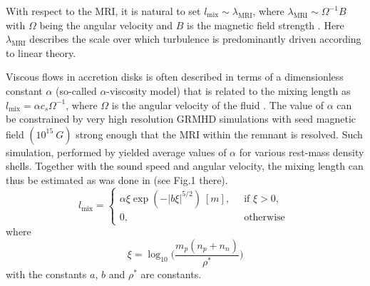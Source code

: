 
With respect to the \ac{MRI}, it is natural to set $l_{\text{mix}} \sim \lambda_{\text{MRI}}$, where
$\lambda_{\text{MRI}} \sim \Omega^{-1}B$ with $\Omega$ being the angular velocity and $B$ is the magnetic
field strength \citep{Duez:2006qe}.
Here $\lambda_{\text{MRI}}$ describes the scale over which turbulence is 
predominantly driven according to linear theory.


Viscous flows in accretion disks is often described in terms of a dimensionless constant $\alpha$
(so-called $\alpha$-viscosity model) that is related to the mixing length as 
%
$ l_{\text{mix}} = \alpha c_s \Omega^{-1} $, 
%
where $\Omega$ is the angular velocity of the fluid \citep{Shakura:1972te}.
%
The value of $\alpha$ can be constrained by very high resolution \ac{GRMHD} simulations with seed magnetic
field $(10^{15}~G)$ strong enough that the \ac{MRI} within the remnant is resolved. 
Such simulation, performed by \citet{Kiuchi:2017zzg} yielded average values of 
$\alpha$ for various rest-mass density shells.
Together with the sound speed and angular velocity, the mixing length can thus be estimated
as was done in \citet{Radice:2020ids} (see Fig.1 there).
%
\begin{equation}
l_{\text{mix}} = 
\begin{cases}
\alpha \xi \exp(-|b\xi|^{5/2}) \: [m], \: &\text{ if } \xi > 0, \\
0, &\text{ otherwise }
\end{cases}
\end{equation}
%
where 
%
\begin{equation}
\xi = \log_{10}\Big( \frac{m_p(n_p + n_n)}{\rho^*} \Big)
\end{equation}
%
with the constants $a$, $b$ and $\rho^*$ are constants.
%


